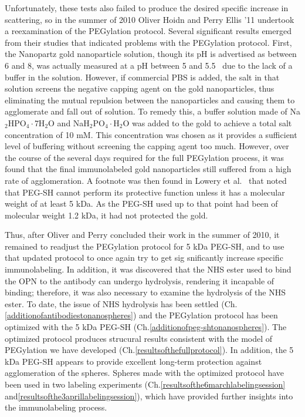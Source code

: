 Unfortunately, these tests also failed to produce the desired specific increase in scattering, so in the summer of 2010 Oliver Hoidn and Perry Ellis '11 undertook a reexamination of the PEGylation protocol. Several significant results emerged from their studies that indicated problems with the PEGylation protocol. First, the Nanopartz gold nanoparticle solution, though its pH is advertised as between 6 and 8, was actually measured at a pH between 5 and 5.5~\citep{hoidnellis} due to the lack of a buffer in the solution. However, if commercial PBS is added, the salt in that solution screens the negative capping agent on the gold nanoparticles, thus eliminating the mutual repulsion between the nanoparticles and causing them to agglomerate and fall out of solution. To remedy this, a buffer solution made of Na$_2$HPO$_4\cdot$7H$_2$O and NaH$_2$PO$_4\cdot$H$_2$O was added to the gold to achieve a total salt concentration of 10 mM. This concentration was chosen as it provides a sufficient level of buffering without screening the capping agent too much. However, over the course of the several days required for the full PEGylation process, it was found that the final immunolabeled gold nanoparticles still suffered from a high rate of agglomeration. A footnote was then found in Lowery et al.~\citep{westpegylation} that noted that PEG-SH cannot perform its protective function unless it has a molecular weight of at least 5 kDa. As the PEG-SH used up to that point had been of molecular weight 1.2 kDa, it had not protected the gold.

Thus, after Oliver and Perry concluded their work in the summer of 2010, it remained to readjust the PEGylation protocol for 5 kDa PEG-SH, and to use that updated protocol to once again try to get sig snificantly increase specific immunolabeling. In addition, it was discovered that the NHS ester used to bind the OPN to the antibody can undergo hydrolysis, rendering it incapable of binding; therefore, it was also necessary to examine the hydrolysis of the NHS ester. To date, the issue of NHS hydrolysis has been settled (Ch.\autoref{additionofantibodiestonanospheres}) and the PEGylation protocol has been optimized with the 5 kDa PEG-SH (Ch.\autoref{additionofpeg-shtonanospheres}). The optimized protocol produces strucural results consistent with the model of PEGylation we have developed (Ch.\autoref{resultsofthefullprotocol}). In addition, the 5 kDa PEG-SH appears to provide excellent long-term protection against agglomeration of the spheres. Spheres made with the optimized protocol have been used in two labeling experiments (Ch.\autoref{resultsofthe6marchlabelingsession} and\autoref{resultsofthe3aprillabelingsession}), which have provided further insights into the immunolabeling process.
